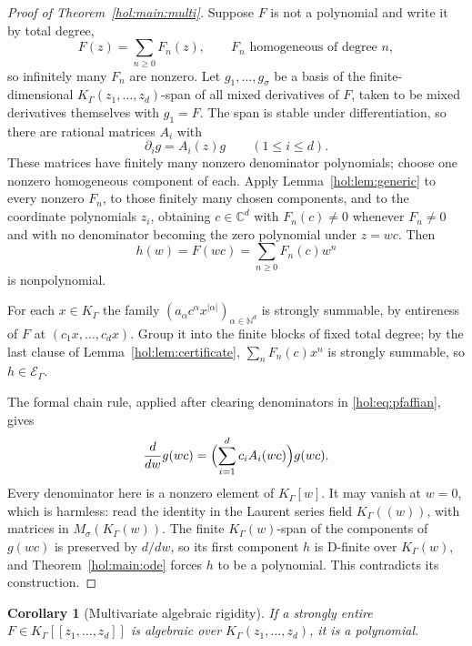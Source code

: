 \documentclass[11pt]{article}
\numberwithin{equation}{section}
\newtheorem{corollary}[theorem]{Corollary}
\theoremstyle{definition}
\theoremstyle{remark}
\newcommand{\C}{\mathbb C}
\newcommand{\N}{\mathbb N}
\newcommand{\K}{K_\Gamma}
\newcommand{\E}{\mathcal E_\Gamma}
\newcommand{\abs}[1]{\lvert#1\rvert}
\begin{document}
\begin{proof}[Proof of Theorem~\ref{hol:main:multi}]
Suppose $F$ is not a polynomial and write it by total degree,
\begin{equation}\label{hol:eq:homogeneous}
 F(z)=\sum_{n\ge0}F_n(z),\qquad F_n\text{ homogeneous of degree }n,
\end{equation}
so infinitely many $F_n$ are nonzero. Let $g_1,\ldots,g_\sigma$ be a basis of
the finite-dimensional $\K(z_1,\ldots,z_d)$-span of all mixed derivatives of
$F$, taken to be mixed derivatives themselves with $g_1=F$. The span is stable
under differentiation, so there are rational matrices $A_i$ with
\begin{equation}\label{hol:eq:pfaffian}
 \partial_ig=A_i(z)g\qquad(1\le i\le d).
\end{equation}
These matrices have finitely many nonzero denominator polynomials; choose one
nonzero homogeneous component of each. Apply Lemma~\ref{hol:lem:generic} to
every nonzero $F_n$, to those finitely many chosen components, and to the
coordinate polynomials $z_i$, obtaining $c\in\C^d$ with $F_n(c)\ne0$ whenever
$F_n\ne0$ and with no denominator becoming the zero polynomial under
$z=wc$. Then
\[
 h(w)=F(wc)=\sum_{n\ge0}F_n(c)w^n
\]
is nonpolynomial.

For each $x\in\K$ the family
$(a_\alpha c^\alpha x^{\abs\alpha})_{\alpha\in\N^d}$ is strongly summable, by
entireness of $F$ at $(c_1x,\ldots,c_dx)$. Group it into the finite blocks of
fixed total degree; by the last clause of Lemma~\ref{hol:lem:certificate},
$\sum_nF_n(c)x^n$ is strongly summable, so $h\in\E$.

The formal chain rule, applied after clearing denominators in
\eqref{hol:eq:pfaffian}, gives
\begin{equation}\label{hol:eq:restricted}
 \frac{d}{dw}g(wc)=\Bigl(\sum_{i=1}^dc_iA_i(wc)\Bigr)g(wc).
\end{equation}
Every denominator here is a nonzero element of $\K[w]$. It may vanish at
$w=0$, which is harmless: read the identity in the Laurent series field
$\K((w))$, with matrices in $M_\sigma(\K(w))$. The finite $\K(w)$-span of the
components of $g(wc)$ is preserved by $d/dw$, so its first component $h$ is
D-finite over $\K(w)$, and Theorem~\ref{hol:main:ode} forces $h$ to be a
polynomial. This contradicts its construction.
\end{proof}

\begin{corollary}[Multivariate algebraic rigidity]\label{hol:cor:multialg}
If a strongly entire $F\in\K[[z_1,\ldots,z_d]]$ is algebraic over
$\K(z_1,\ldots,z_d)$, it is a polynomial.
\end{corollary}
\end{document}
